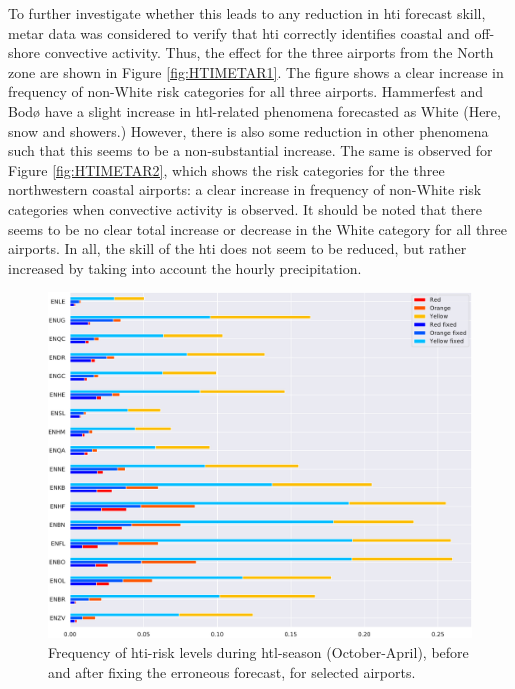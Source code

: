 To further investigate whether this leads to any reduction in \acrshort{hti} forecast skill, \acrshort{metar} data was considered to verify that \acrshort{hti} correctly identifies coastal and off-shore convective activity. Thus, the effect for the three airports from the North zone are shown in Figure \ref{fig:HTIMETAR1}. The figure shows a clear increase in frequency of non-White risk categories for all three airports. Hammerfest and Bodø have a slight increase in \acrshort{htl}-related phenomena forecasted as White (Here, snow and showers.) However, there is also some reduction in other phenomena such that this seems to be a non-substantial increase. The same is observed for Figure \ref{fig:HTIMETAR2}, which shows the risk categories for the three northwestern coastal airports: a clear increase in frequency of non-White risk categories when convective activity is observed. It should be noted that there seems to be no clear total increase or decrease in the White category for all three airports. In all, the skill of the \acrshort{hti} does not seem to be reduced, but rather increased by taking into account the hourly precipitation. %

\begin{figure}[H]
    \centering
     \includegraphics[width=\textwidth]{Figures/fixeffect.pdf}
    \caption{Frequency of \acrshort{hti}-risk levels during \acrshort{htl}-season (October-April), before and after fixing the erroneous forecast, for selected airports.}
    \label{fig:fixeffect}
\end{figure}

